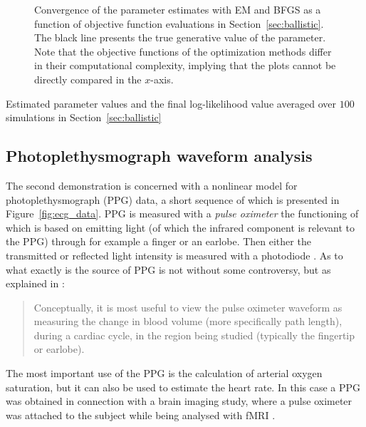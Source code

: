 \begin{figure}[htbp]
{\begin{subfigure}[b]{0.5\textwidth+0.4in}
    \end{subfigure}}%
    \caption{Convergence of the parameter estimates with EM and BFGS
    as a function of objective function evaluations in Section~\ref{sec:ballistic}. The black line
    presents the true generative value of the parameter.
    Note that the
    objective functions of the optimization methods differ in their computational complexity, 
    implying that the plots cannot be directly compared in the $x$-axis. }\label{fig:ballistic_est}
 \end{figure}
 
\begin{table}[htbp]
	\caption{Estimated parameter values and the final
	log-likelihood value 
	averaged over $100$ simulations in Section~\ref{sec:ballistic}}
	\label{table:ballistic_restults}
	\centering
	\footnotesize
	
\end{table} 


\clearpage



\subsection{Photoplethysmograph waveform analysis}\label{sec:harmonic}

The second demonstration is concerned with a nonlinear model for
photoplethysmograph (PPG) data, a short sequence of which is presented
in Figure~\ref{fig:ecg_data}. PPG is measured with 
a \emph{pulse oximeter} the functioning of which is based on
emitting light (of which the infrared component is relevant to the PPG)
through for example a finger or an earlobe. Then either the transmitted
or reflected light intensity is measured with a photodiode \parencite{Shelley2007}. 
As to what exactly is the source of PPG is not without some controversy,
but as explained in \textcite{Shelley2007}:
\begin{quotation}
Conceptually, it is most useful to view the pulse
oximeter waveform as measuring the change in blood
volume (more specifically path length), during a cardiac cycle, 
in the region being studied (typically the fingertip or earlobe).
\end{quotation}
The most important use of the PPG is the calculation of arterial oxygen
saturation, but it can also be used to estimate the heart rate.
In this case a PPG was obtained in connection with a brain imaging study, where
a pulse oximeter was attached to the subject while being analysed with fMRI \parencite{Sarkka2012}.   

